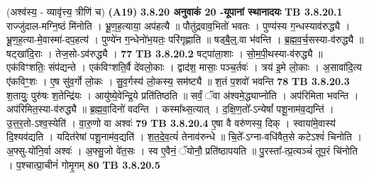 \documentclass[17pt]{extarticle}
\begin{document}
{{{{{{{{{{{{{{{{{{{{{{                  \newline
                                    (अश्व॑स्य॒ - व्यावृ॑त्त्य॒ त्रीणि॑ च) \textbf{(A19)} \newline \newline
                \textbf{ 3.8.20    अनुवाकं   20 -यूपानां स्थानादयः} \newline
                                \textbf{ TB 3.8.20.1} \newline
                  राज्जु॑दाल-मग्नि॒ष्ठं मि॑नोति । भ्रू॒ण॒ह॒त्याया॒ अप॑हत्यै ॥ पौतु॑द्रवाव॒भितो॑ भवतः । पुण्य॑स्य ग॒न्धस्याव॑रुद्ध्यै । भ्रू॒ण॒ह॒त्या-मे॒वास्मा॑-दप॒हत्य॑ । पुण्ये॑न ग॒न्धेनो॑भ॒यतः॒ परि॑गृह्णाति ॥ षड्बै॒॒ल्॒.वा भ॑वन्ति । ब्र॒ह्म॒व॒र्च॒सस्या-व॑रुद्ध्यै ॥ षट्खा॑दि॒राः । तेज॒सो-ऽव॑रुद्ध्यै । \textbf{ 77} \newline
                  \newline
                                \textbf{ TB 3.8.20.2} \newline
                  षट्पा॑ला॒शाः । सो॒म॒पी॒थस्या-व॑रुद्ध्यै ॥ एक॑विꣳशतिः॒ संप॑द्यन्ते । एक॑विꣳशति॒र्वै दे॑वलो॒काः । द्वाद॑श॒ मासाः॒ पञ्च॒र्तवः॑ । त्रय॑ इ॒मे लो॒काः । अ॒सावा॑दि॒त्य ए॑कविꣳ॒॒शः । ए॒ष सु॑व॒र्गो लो॒कः । सु॒व॒र्गस्य॑ लो॒कस्य॒ सम॑ष्ट्यै ॥ श॒तं प॒शवो॑ भवन्ति \textbf{ 78} \newline
                  \newline
                                \textbf{ TB 3.8.20.3} \newline
                  श॒तायुः॒ पुरु॑षः श॒तेन्द्रि॑यः । आयु॑ष्ये॒वेन्द्रि॒ये प्रति॑तिष्ठति ॥ सर्वं॒ ॅवा अ॑श्वमे॒द्ध्याप्नो॑ति । अप॑रिमिता भवन्ति । अप॑रिमित॒स्या-व॑रुद्ध्यै ॥ ब्र॒ह्म॒वा॒दिनो॑ वदन्ति । कस्मा᳚थ्स॒त्यात् । द॒क्षि॒ण॒तो᳚-ऽन्येषां᳚ पशू॒नाम॑व॒द्यन्ति॑ । उ॒त्त॒र॒तो-ऽश्व॒स्येति॑ । वा॒रु॒णो वा अश्वः॑ \textbf{ 79} \newline
                  \newline
                                \textbf{ TB 3.8.20.4} \newline
                  ए॒षा वै वरु॑णस्य॒ दिक् । स्वाया॑मे॒वास्य॑ दि॒श्यव॑द्यति । यदित॑रेषां पशू॒नाम॑व॒द्यति॑ । श॒त॒दे॒व॒त्यं॑ तेनाव॑रुन्धे ॥ चि॒ते᳚-ऽग्ना-वधि॑वैत॒से कटेऽश्वं॑ चिनोति । अ॒फ्सु-यो॑नि॒र्वा अश्वः॑ । अ॒फ्सु॒जो वे॑त॒सः । स्व ए॒वैनं॒ ॅयोनौ॒ प्रति॑ष्ठापयति ॥ पु॒रस्ता᳚-त्प्र॒त्यञ्चं॑ तूप॒रं चि॑नोति । प॒श्चात्प्रा॒चीनं॑ गोमृ॒गम् \textbf{ 80} \newline
                  \newline
                                \textbf{ TB 3.8.20.5} \newline
}}}}}}}}}}}}}}}}}}}}}}
\end{document}
